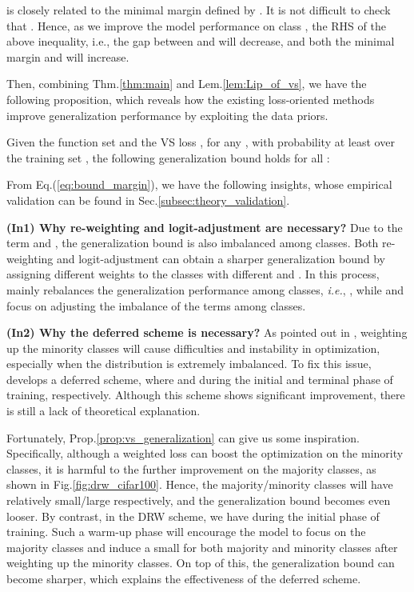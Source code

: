 \begin{remark}
     is closely related to the minimal margin defined by . It is not difficult to check that . Hence, as we improve the model performance on class , the RHS of the above inequality, i.e., the gap between  and  will decrease, and both the minimal margin and  will increase.
\end{remark}

Then, combining Thm.\ref{thm:main} and Lem.\ref{lem:Lip_of_vs}, we have the following proposition, which reveals how the existing loss-oriented methods improve generalization performance by exploiting the data priors.
\begin{proposition}
    \label{prop:vs_generalization}
    Given the function set  and the VS loss  , for any , with probability at least  over the training set , the following generalization bound holds for all :
    
\end{proposition}

From Eq.(\ref{eq:bound_margin}), we have the following insights, whose empirical validation can be found in Sec.\ref{subsec:theory_validation}.

\textbf{(In1) Why re-weighting and logit-adjustment are necessary?} Due to the term  and , the generalization bound is also imbalanced among classes. Both re-weighting and logit-adjustment can obtain a sharper generalization bound by assigning different weights to the classes with different  and . In this process,  mainly rebalances the generalization performance among classes, \textit{i.e.}, , while  and  focus on adjusting the imbalance of the terms  among classes.

\textbf{(In2) Why the deferred scheme is necessary?} As pointed out in \cite{DBLP:conf/cvpr/CuiJLSB19,DBLP:conf/cvpr/HuangLLT16}, weighting up the minority classes will cause difficulties and instability in optimization, especially when the distribution is extremely imbalanced. To fix this issue, \citet{DBLP:conf/nips/CaoWGAM19} develops a deferred scheme, where  and  during the initial and terminal phase of training, respectively. Although this scheme shows significant improvement, there is still a lack of theoretical explanation. 

Fortunately, Prop.\ref{prop:vs_generalization} can give us some inspiration. Specifically, although a weighted loss can boost the optimization on the minority classes, it is harmful to the further improvement on the majority classes, as shown in Fig.\ref{fig:drw_cifar100}. Hence, the majority/minority classes will have relatively small/large  respectively, and the generalization bound becomes even looser. By contrast, in the DRW scheme, we have  during the initial phase of training. Such a warm-up phase will encourage the model to focus on the majority classes and induce a small  for both majority and minority classes after weighting up the minority classes. On top of this, the generalization bound can become sharper, which explains the effectiveness of the deferred scheme.

